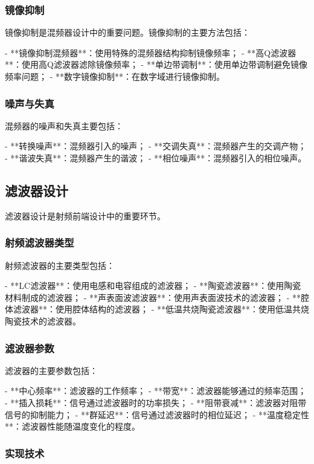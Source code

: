 ﻿\documentclass[UTF8]{ctexbook}
\begin{document}
\subsubsection{镜像抑制}

镜像抑制是混频器设计中的重要问题。镜像抑制的主要方法包括：

- **镜像抑制混频器**：使用特殊的混频器结构抑制镜像频率；
- **高Q滤波器**：使用高Q滤波器滤除镜像频率；
- **单边带调制**：使用单边带调制避免镜像频率问题；
- **数字镜像抑制**：在数字域进行镜像抑制。

\subsubsection{噪声与失真}

混频器的噪声和失真主要包括：

- **转换噪声**：混频器引入的噪声；
- **交调失真**：混频器产生的交调产物；
- **谐波失真**：混频器产生的谐波；
- **相位噪声**：混频器引入的相位噪声。

\subsection{滤波器设计}

滤波器设计是射频前端设计中的重要环节。

\subsubsection{射频滤波器类型}

射频滤波器的主要类型包括：

- **LC滤波器**：使用电感和电容组成的滤波器；
- **陶瓷滤波器**：使用陶瓷材料制成的滤波器；
- **声表面波滤波器**：使用声表面波技术的滤波器；
- **腔体滤波器**：使用腔体结构的滤波器；
- **低温共烧陶瓷滤波器**：使用低温共烧陶瓷技术的滤波器。

\subsubsection{滤波器参数}

滤波器的主要参数包括：

- **中心频率**：滤波器的工作频率；
- **带宽**：滤波器能够通过的频率范围；
- **插入损耗**：信号通过滤波器时的功率损失；
- **阻带衰减**：滤波器对阻带信号的抑制能力；
- **群延迟**：信号通过滤波器时的相位延迟；
- **温度稳定性**：滤波器性能随温度变化的程度。

\subsubsection{实现技术}
\end{document}
